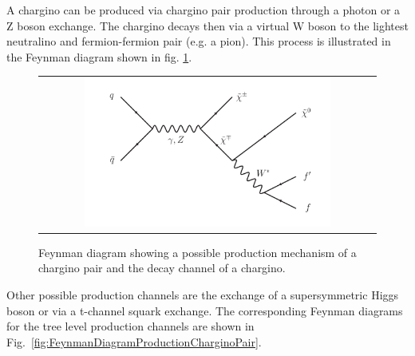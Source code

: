 
A chargino can be produced via chargino pair production through a photon or a Z boson exchange. The chargino decays then via a virtual W boson to the lightest neutralino and fermion-fermion pair (e.g. a pion).
This process is illustrated in the Feynman diagram shown in fig. \ref{fig:FeynmanDiagram}.

\begin{figure}[!tb]
  \centering 
  \begin{tabular}{c}
    \includegraphics[width=0.75\textwidth]{figures/analysis/ChiChi_ProductionAndDecay.pdf}
  \end{tabular}
  \caption{Feynman diagram showing a possible production mechanism of a chargino pair and the decay channel of a chargino.}
  \label{fig:FeynmanDiagram}
\end{figure}

Other possible production channels are the exchange of a supersymmetric Higgs boson or via a t-channel squark exchange. 
The corresponding Feynman diagrams for the tree level production channels are shown in Fig.~\ref{fig:FeynmanDiagramProductionCharginoPair}.

